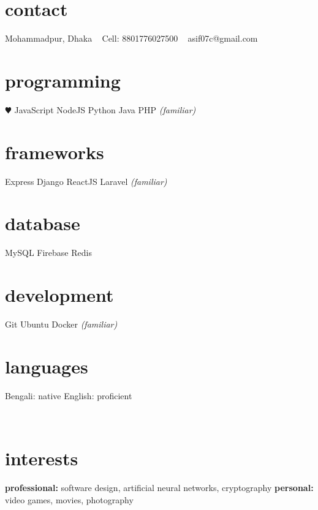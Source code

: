 \documentclass[]{exponential-cv}
\begin{document}


\begin{aside}
	\section{contact}
	Mohammadpur, Dhaka
	~
	Cell: 8801776027500
	~
	asif07c@gmail.com
	~
	\href{https://linkedin.com/in/aasifislam}{}
	~
	\section{programming}
	 {\color{red} $\varheartsuit$} JavaScript
	NodeJS
	Python
	Java
	PHP \emph{(familiar)}
	~
	\section{frameworks}
	Express
	Django
	ReactJS
	Laravel \emph{(familiar)}
	~
	\section{database}
	MySQL
	Firebase
	Redis
	~
	\section{development}
	Git
	Ubuntu
	Docker \emph{(familiar)}
	~
	\section{languages}
	Bengali: native
	English: proficient
\end{aside}



\ \newline


\newpage


\section{interests}
\textbf{professional:} software design, artificial neural networks, cryptography
\newline
\textbf{personal:} video games, movies, photography
\end{document}

